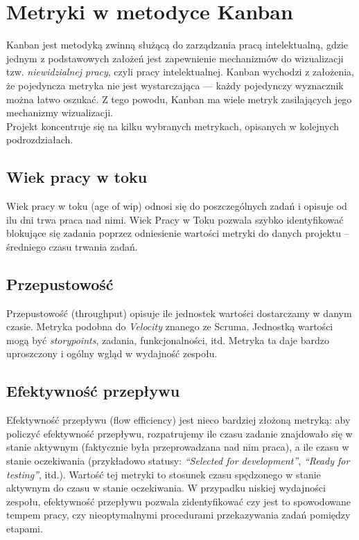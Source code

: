 \section{Metryki w metodyce Kanban}
Kanban jest metodyką zwinną służącą do zarządzania pracą intelektualną, gdzie jednym z podstawowych założeń jest zapewnienie mechanizmów
do wizualizacji tzw. \textit{niewidzialnej pracy}, czyli pracy intelektualnej. Kanban wychodzi z założenia, że pojedyncza metryka nie jest wystarczająca --- każdy
pojedynczy wyznacznik można łatwo oszukać. Z tego powodu, Kanban ma wiele metryk zasilających jego mechanizmy wizualizacji. \\
Projekt koncentruje się na kilku wybranych metrykach, opisanych w kolejnych podrozdziałach.

\subsection*{Wiek pracy w toku}
Wiek pracy w toku (age of wip) odnosi się do poszczególnych zadań i opisuje od ilu dni trwa praca nad nimi.
Wiek Pracy w Toku pozwala szybko identyfikować blokujące się zadania poprzez odniesienie wartości metryki do danych projektu -- średniego czasu trwania zadań.

\subsection*{Przepustowość}
Przepustowość (throughput) opisuje ile jednostek wartości dostarczamy w danym czasie. Metryka podobna do \textit{Velocity} znanego ze Scruma. Jednostką wartości mogą być \textit{storypoints}, zadania, funkcjonalności, itd.
Metryka ta daje bardzo uproszczony i ogólny wgląd w wydajność zespołu.

\subsection*{Efektywność przepływu}
Efektywność przepływu (flow efficiency) jest nieco bardziej złożoną metryką: aby policzyć efektywność przepływu, rozpatrujemy ile czasu zadanie znajdowało się w stanie aktywnym (faktycznie była przeprowadzana nad nim praca), a ile czasu
w stanie oczekiwania (przykładowo statusy: \textit{``Selected for development''}, \textit{``Ready for testing''}, itd.). Wartość tej metryki to stosunek czasu spędzonego w stanie aktywnym do czasu w stanie oczekiwania.
W przypadku niskiej wydajności zespołu, efektywność przepływu pozwala zidentyfikować czy jest to spowodowane tempem pracy, czy nieoptymalnymi procedurami przekazywania zadań pomiędzy etapami.

